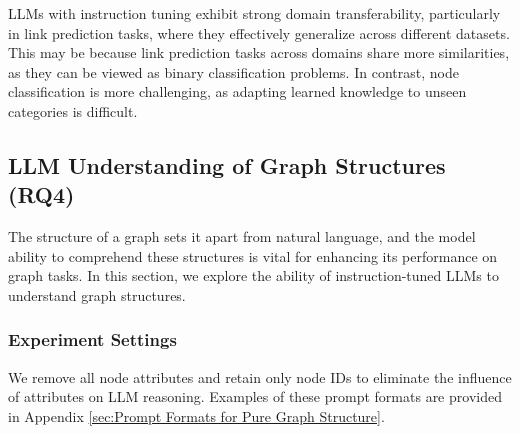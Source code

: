 \begin{remark}
LLMs with instruction tuning exhibit strong domain transferability, particularly in link prediction tasks, where they effectively generalize across different datasets. This may be because link prediction tasks across domains share more similarities, as they can be viewed as binary classification problems. In contrast, node classification is more challenging, as adapting learned knowledge to unseen categories is difficult. %
\end{remark}


\subsection{LLM Understanding of Graph Structures (RQ4)}
\label{sec:Case 5}
The structure of a graph sets it apart from natural language, and the model ability to comprehend these structures is vital for enhancing its performance on graph tasks. In this section, we explore the ability of instruction-tuned LLMs to understand graph structures.

\subsubsection{Experiment Settings}
We remove all node attributes and retain only node IDs to eliminate the influence of attributes on LLM reasoning. Examples of these prompt formats are provided in Appendix \ref{sec:Prompt Formats for Pure Graph Structure}.



